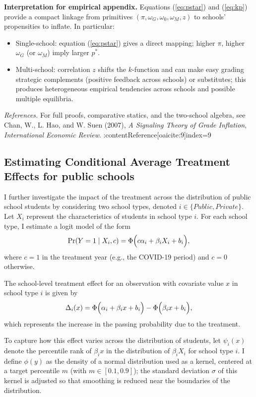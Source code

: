 \medskip
\noindent\textbf{Interpretation for empirical appendix.} Equations (\ref{eq:pstar}) and (\ref{eq:kp}) provide a compact linkage from primitives \((\pi,\omega_G,\omega_0,\omega_M,z)\) to schools' propensities to inflate. In particular:
\begin{itemize}
  \item Single-school: equation (\ref{eq:pstar}) gives a direct mapping; higher \(\pi\), higher \(\omega_G\) (or \(\omega_M\)) imply larger \(p^*\).
  \item Multi-school: correlation \(z\) shifts the \(k\)-function and can make easy grading strategic complements (positive feedback across schools) or substitutes; this produces heterogeneous empirical tendencies across schools and possible multiple equilibria. 
\end{itemize}

\noindent\textit{References.} For full proofs, comparative statics, and the two-school algebra, see Chan, W., L. Hao, and W. Suen (2007), \textit{A Signaling Theory of Grade Inflation}, \emph{International Economic Review}. :contentReference[oaicite:9]{index=9}

\subsection{Estimating Conditional Average Treatment Effects for public schools}

I further investigate the impact of the treatment across the distribution of public school students by considering two school types, denoted \(i \in \{Public, Private\}\). Let \(X_i\) represent the characteristics of students in school type \(i\). For each school type, I estimate a logit model of the form
\[
\Pr(Y=1 \mid X_i, c) = \Phi\Bigl(c\alpha_i + \beta_i X_i + b_i\Bigr),
\]
where \(c=1\) in the treatment year (e.g., the COVID-19 period) and \(c=0\) otherwise.

The school-level treatment effect for an observation with covariate value \(x\) in school type \(i\) is given by
\[
\Delta_i(x)=\Phi\Bigl(\alpha_i+\beta_i x+b_i\Bigr)-\Phi\Bigl(\beta_i x+b_i\Bigr),
\]
which represents the increase in the passing probability due to the treatment.

To capture how this effect varies across the distribution of students, let \(\psi_i(x)\) denote the percentile rank of \(\beta_i x\) in the distribution of \(\beta_iX_i\) for school type \(i\). I define \(\phi(y)\) as the density of a normal distribution used as a kernel, centered at a target percentile \(m\) (with \(m\in [0.1,0.9]\)); the standard deviation \(\sigma\) of this kernel is adjusted so that smoothing is reduced near the boundaries of the distribution.

